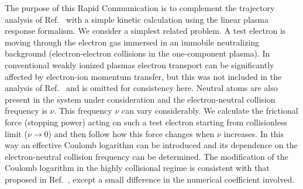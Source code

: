 \documentclass[twocolumn, 
  aps, prl,
  amsmath,amssymb,
  ]{revtex4-1}
\begin{document}


The purpose of this Rapid Communication is to complement the trajectory analysis of Ref.~\cite{HagelaarPRL2019} with a simple kinetic calculation using the linear plasma response formalism. We consider a simplest related problem. A test electron is moving through the electron gas immersed in an immobile neutralizing background (electron-electron collisions in the one-component plasma). In conventional weakly ionized plasmas electron transport can be significantly affected by electron-ion momentum transfer, but this was not included in the analysis of Ref.~\cite{HagelaarPRL2019} and is omitted for consistency here. Neutral atoms are also present in the system under consideration and the electron-neutral collision frequency is $\nu$. This frequency $\nu$ can vary considerably. We calculate the frictional force (stopping power) acting on such a test electron starting from collisionless limit ($\nu\rightarrow 0$) and then follow how this force changes when $\nu$ increases. In this way an effective Coulomb logarithm can be introduced and its dependence on the electron-neutral collision frequency can be determined. The modification of the Coulomb logarithm in the highly collisional regime is consistent with that proposed in Ref.~\cite{HagelaarPRL2019}, except a small difference in the numerical coefficient involved. 
\end{document}
